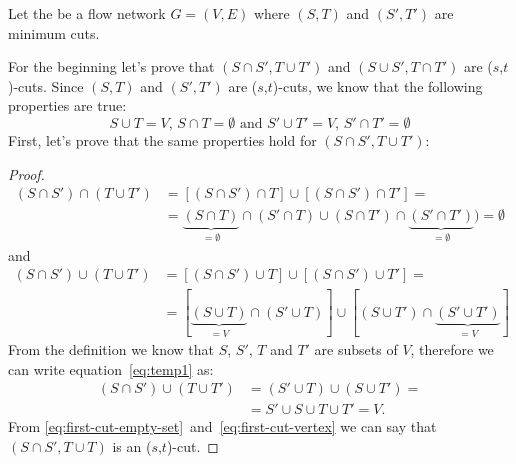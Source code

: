 
\renewcommand{\u}{\cup}
\newcommand{\n}{\cap}
\newcommand{\stcut}{($s$,$t$)-cut}
\newcommand{\stcuts}{($s$,$t$)-cuts}


Let the be a flow network $G=(V,E)$ where $(S,T)$ and $(S',T')$ are minimum cuts.

For the beginning let's prove that $(S \n S', T \u T')$ and $(S \u S', T \n T')$ are \stcuts{}.
Since $(S,T)$ and $(S',T')$ are \stcuts{}, we know that the following properties are true:
\begin{equation}
S \u T = V \text{, } S \n T = \emptyset \text{ and }
S' \u T' = V \text{, } S' \n T' = \emptyset
\label{eq:start}
\end{equation}
First, let's prove that the same properties hold for $(S \n S', T \u T')$:
\begin{proof}
\begin{align}
(S \n S') \n (T \u T') &= [(S \n S') \n T] \u [(S \n S') \n T'] = \nonumber \\ 
&= \underbrace{(S \n T)}_{=\emptyset} \n (S' \n T) \u (S \n T') \n \underbrace{(S' \n T')}_{=\emptyset}) = \emptyset \label{eq:first-cut-empty-set}
\end{align}
and
\begin{align}
(S \n S') \u (T \u T') &= [(S \n S') \u T] \u [(S \n S') \u T'] = \nonumber \\
&= [\underbrace{(S \u T)}_{=V} \n (S' \u T)] \u [(S \u T') \n \underbrace{(S' \u T')}_{=V}] \label{eq:temp1}
\end{align}
From the definition we know that $S$, $S'$, $T$ and $T'$ are subsets of $V$, therefore we can write equation~\ref{eq:temp1} as:
\begin{align}
(S \n S') \u (T \u T') &= (S' \u T) \u (S \u T') = \nonumber \\
&= S' \u S \u T \u T' = V. \label{eq:first-cut-vertex}
\end{align}
From \ref{eq:first-cut-empty-set}~and~\ref{eq:first-cut-vertex} we can say that $(S \n S', T \u T)$ is an \stcut{}.
\end{proof}

